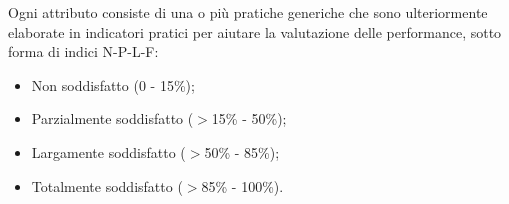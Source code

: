 \documentclass[NormeDiProgetto.tex]{subfiles}
\begin{document}
Ogni attributo consiste di una o più pratiche generiche che sono ulteriormente elaborate in indicatori pratici per aiutare la valutazione delle performance, sotto forma di indici N-P-L-F:
\begin{itemize}
	\item Non soddisfatto (0 - 15\%);
	\item Parzialmente soddisfatto ($ > $15\% - 50\%);
	\item Largamente soddisfatto ($ > $50\% - 85\%);
	\item Totalmente soddisfatto ($ > $85\% - 100\%).
\end{itemize}
\end{document}
